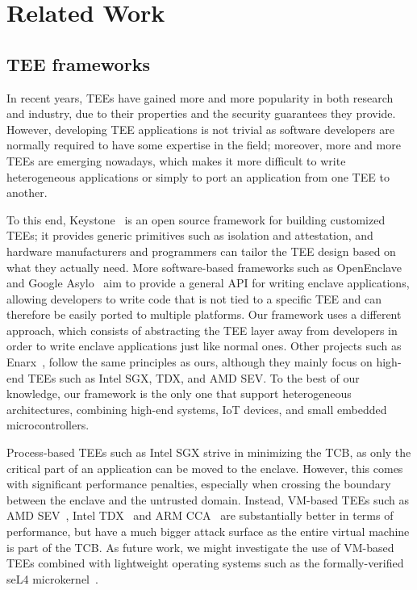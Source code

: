 \section{Related Work}
\label{sec:related-work}

\subsection{TEE frameworks}

In recent years, \acp{TEE} have gained more and more popularity in both research
and industry, due to their properties and the security guarantees they provide.
However, developing \ac{TEE} applications is not trivial as software developers
are normally required to have some expertise in the field; moreover, more and
more \acp{TEE} are emerging nowadays, which makes it more difficult to write
heterogeneous applications or simply to port an application from one \ac{TEE} to
another. 

To this end, Keystone~\cite{lee2020keystone} is an open source framework for
building customized \acp{TEE}; it provides generic primitives such as isolation
and attestation, and hardware manufacturers and programmers can tailor the
\ac{TEE} design based on what they actually need. More software-based frameworks
such as OpenEnclave~\cite{openenclave} and Google Asylo~\cite{googleasylo} aim
to provide a general API for writing enclave applications, allowing developers
to write code that is not tied to a specific \ac{TEE} and can therefore be
easily ported to multiple platforms. Our framework uses a different approach,
which consists of abstracting the \ac{TEE} layer away from developers in order
to write enclave applications just like normal ones. Other projects such as
Enarx~\cite{enarx}, follow the same principles as ours, although they mainly
focus on high-end \acp{TEE} such as Intel \ac{SGX}, TDX, and AMD SEV. To the
best of our knowledge, our framework is the only one that support heterogeneous
architectures, combining high-end systems, IoT devices, and small embedded
microcontrollers.

Process-based \acp{TEE} such as Intel \ac{SGX} strive in minimizing the
\ac{TCB}, as only the critical part of an application can be moved to the
enclave. However, this comes with significant performance penalties, especially
when crossing the boundary between the enclave and the untrusted domain.
Instead, VM-based \acp{TEE} such as AMD SEV~\cite{kaplan2016amd}, Intel
TDX~\cite{intelTdx} and ARM CCA~\cite{li2022design} are substantially better in
terms of performance, but have a much bigger attack surface as the entire
virtual machine is part of the \ac{TCB}. As future work, we might investigate
the use of VM-based \acp{TEE} combined with lightweight operating systems such
as the formally-verified seL4 microkernel~\cite{klein2009sel4}.


